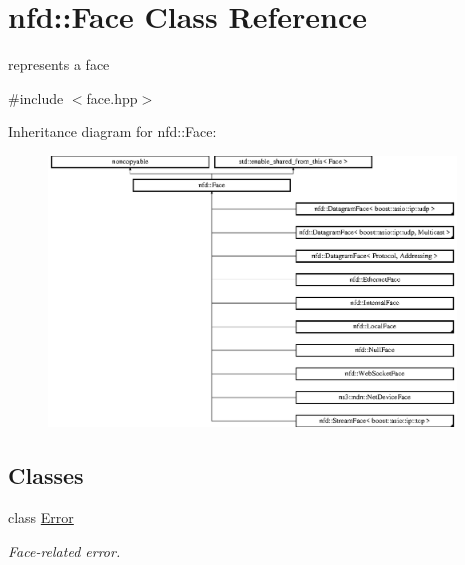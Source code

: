\hypertarget{classnfd_1_1Face}{}\section{nfd\+:\+:Face Class Reference}
\label{classnfd_1_1Face}


represents a face  




{\ttfamily \#include $<$face.\+hpp$>$}

Inheritance diagram for nfd\+:\+:Face\+:\begin{figure}[H]
\begin{center}
\leavevmode
\includegraphics[height=7.179487cm]{classnfd_1_1Face}
\end{center}
\end{figure}
\subsection*{Classes}
\begin{DoxyCompactItemize}
\item 
class \hyperlink{classnfd_1_1Face_1_1Error}{Error}
\begin{DoxyCompactList}\small\item\em Face-\/related error. \end{DoxyCompactList}\end{DoxyCompactItemize}
